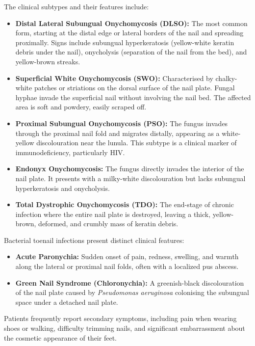 The clinical subtypes and their features include:
\begin{itemize}
    \item \textbf{Distal Lateral Subungual Onychomycosis (DLSO):} The most common form, starting at the distal edge or lateral borders of the nail and spreading proximally. Signs include subungual hyperkeratosis (yellow-white keratin debris under the nail), onycholysis (separation of the nail from the bed), and yellow-brown streaks.
    \item \textbf{Superficial White Onychomycosis (SWO):} Characterised by chalky-white patches or striations on the dorsal surface of the nail plate. Fungal hyphae invade the superficial nail without involving the nail bed. The affected area is soft and powdery, easily scraped off.
    \item \textbf{Proximal Subungual Onychomycosis (PSO):} The fungus invades through the proximal nail fold and migrates distally, appearing as a white-yellow discolouration near the lunula. This subtype is a clinical marker of immunodeficiency, particularly HIV.
    \item \textbf{Endonyx Onychomycosis:} The fungus directly invades the interior of the nail plate. It presents with a milky-white discolouration but lacks subungual hyperkeratosis and onycholysis.
    \item \textbf{Total Dystrophic Onychomycosis (TDO):} The end-stage of chronic infection where the entire nail plate is destroyed, leaving a thick, yellow-brown, deformed, and crumbly mass of keratin debris.
\end{itemize}

Bacterial toenail infections present distinct clinical features:
\begin{itemize}
    \item \textbf{Acute Paronychia:} Sudden onset of pain, redness, swelling, and warmth along the lateral or proximal nail folds, often with a localized pus abscess.
    \item \textbf{Green Nail Syndrome (Chloronychia):} A greenish-black discolouration of the nail plate caused by \emph{Pseudomonas aeruginosa} colonising the subungual space under a detached nail plate.
\end{itemize}

Patients frequently report secondary symptoms, including pain when wearing shoes or walking, difficulty trimming nails, and significant embarrassment about the cosmetic appearance of their feet.

